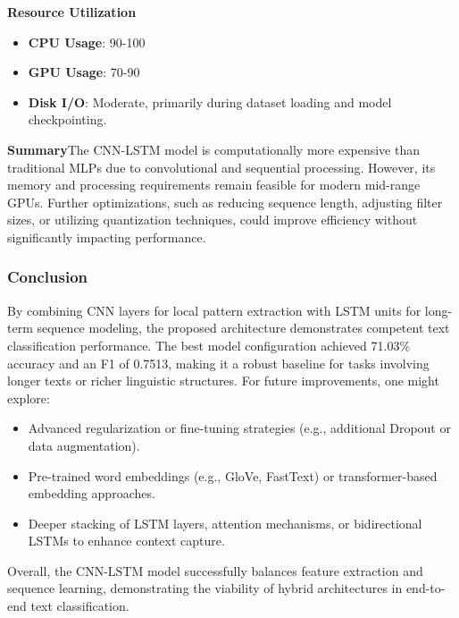 \textbf{Resource Utilization}

\begin{itemize}
\item \textbf{CPU Usage}: 90-100%
\item \textbf{GPU Usage}: 70-90%
\item \textbf{Disk I/O}: Moderate, primarily during dataset loading and model checkpointing.
\end{itemize}

\textbf{Summary}The CNN-LSTM model is computationally more expensive than traditional MLPs due to convolutional and sequential processing. However, its memory and processing requirements remain feasible for modern mid-range GPUs. Further optimizations, such as reducing sequence length, adjusting filter sizes, or utilizing quantization techniques, could improve efficiency without significantly impacting performance.

\subsubsection{Conclusion}

By combining CNN layers for local pattern extraction with LSTM units for long-term sequence modeling, the proposed architecture demonstrates competent text classification performance. The best model configuration achieved 71.03\% accuracy and an F1 of 0.7513, making it a robust baseline for tasks involving longer texts or richer linguistic structures. For future improvements, one might explore:
\begin{itemize}
    \item Advanced regularization or fine-tuning strategies (e.g., additional Dropout or data augmentation).
    \item Pre-trained word embeddings (e.g., GloVe, FastText) or transformer-based embedding approaches.
    \item Deeper stacking of LSTM layers, attention mechanisms, or bidirectional LSTMs to enhance context capture.
\end{itemize}

Overall, the CNN-LSTM model successfully balances feature extraction and sequence learning, demonstrating the viability of hybrid architectures in end-to-end text classification.

\newpage